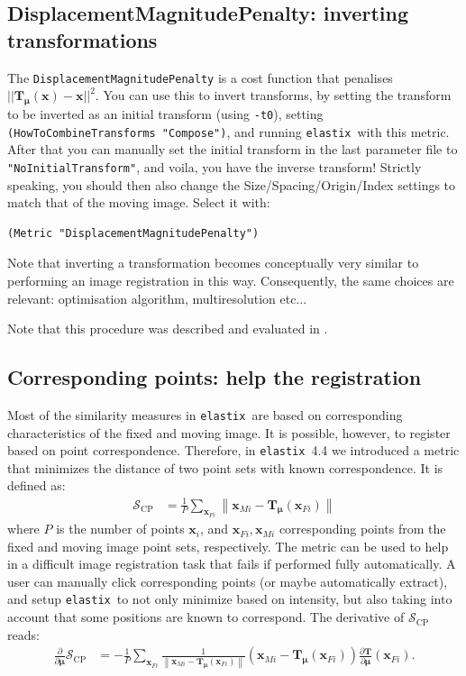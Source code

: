 \documentclass[]{report}
\newcommand{\elastix}{\texttt{elastix}}
\newcommand{\vx}{\bm{x}}
\newcommand{\vmu}{\bm{\mu}}
\newcommand{\vT}{\bm{T}}
\newcommand{\vTm}{\bm{T}_{\vmu}}
\newcommand{\Sim}{\mathcal{S}}
\begin{document}
\subsection{DisplacementMagnitudePenalty: inverting transformations}

The \texttt{DisplacementMagnitudePenalty} is a cost function that
penalises $||\vTm(\vx)-\vx||^2$. You can use this to invert
transforms, by setting the transform to be inverted as an initial
transform (using \texttt{-t0}), setting
\texttt{(HowToCombineTransforms "Compose")}, and running \elastix\
with this metric. After that you can manually set the initial
transform in the last parameter file to
\texttt{"NoInitialTransform"}, and voila, you have the inverse
transform! Strictly speaking, you should then also change the
Size/Spacing/Origin/Index settings to match that of the moving
image. Select it with: \small
\begin{verbatim}
(Metric "DisplacementMagnitudePenalty")
\end{verbatim}
\normalsize Note that inverting a transformation becomes
conceptually very similar to performing an image registration in
this way. Consequently, the same choices are relevant: optimisation
algorithm, multiresolution etc...

Note that this procedure was described and evaluated in \cite{Metz10}.

\subsection{Corresponding points: help the registration}

Most of the similarity measures in \elastix\ are based on
corresponding characteristics of the fixed and moving image. It is
possible, however, to register based on point correspondence.
Therefore, in \elastix\ 4.4 we introduced a metric that minimizes
the distance of two point sets with known correspondence. It is
defined as:
\begin{align}
\Sim_{\mathrm{CP}} &= \frac{1}{P} \sum_{\vx_{Fi}} \left\| \vx_{Mi} -
\vTm(\vx_{Fi}) \right\|
\end{align}
where $P$ is the number of points $\vx_i$, and $\vx_{Fi}, \vx_{Mi}$
corresponding points from the fixed and moving image point sets,
respectively. The metric can be used to help in a difficult image
registration task that fails if performed fully automatically. A
user can manually click corresponding points (or maybe automatically
extract), and setup \elastix\ to not only minimize based on
intensity, but also taking into account that some positions are
known to correspond. The derivative of $\Sim_{\mathrm{CP}}$ reads:
\begin{align}
\frac{\partial}{\partial \vmu} \Sim_{\mathrm{CP}} &= -\frac{1}{P}
\sum_{\vx_{Fi}} \frac{1}{\left\| \vx_{Mi} - \vTm(\vx_{Fi})
\right\|} \left( \vx_{Mi} - \vTm(\vx_{Fi}) \right) \frac{\partial
\vT}{\partial \vmu}(\vx_{Fi}).
\end{align}
\end{document}
